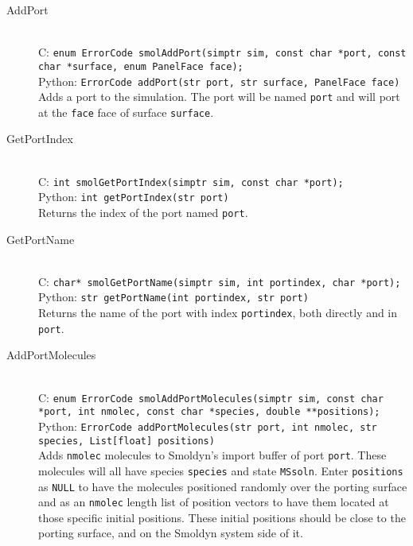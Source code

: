 \documentclass {book}
\begin{document}
\begin{description}

\item[AddPort]
\hfill \\
C: \texttt{enum ErrorCode smolAddPort(simptr sim, const char *port, const char *surface, enum PanelFace face);}\\
Python: \texttt{ErrorCode addPort(str port, str surface, PanelFace face)}\\
Adds a port to the simulation. The port will be named \texttt{port} and will port at the \texttt{face} face of surface \texttt{surface}.

\item[GetPortIndex]
\hfill \\
C: \texttt{int smolGetPortIndex(simptr sim, const char *port);}\\
Python: \texttt{int getPortIndex(str port)}\\
Returns the index of the port named \texttt{port}.

\item[GetPortName]
\hfill \\
C: \texttt{char* smolGetPortName(simptr sim, int portindex, char *port);}\\
Python: \texttt{str getPortName(int portindex, str port)}\\
Returns the name of the port with index \texttt{portindex}, both directly and in \texttt{port}.

\item[AddPortMolecules]
\hfill \\
C: \texttt{enum ErrorCode smolAddPortMolecules(simptr sim, const char *port, int nmolec, const char *species, double **positions);}\\
Python: \texttt{ErrorCode addPortMolecules(str port, int nmolec, str species, List[float] positions)}\\
Adds \texttt{nmolec} molecules to Smoldyn's import buffer of port \texttt{port}. These molecules will all have species \texttt{species} and state \texttt{MSsoln}. Enter \texttt{positions} as \texttt{NULL} to have the molecules positioned randomly over the porting surface and as an \texttt{nmolec} length list of position vectors to have them located at those specific initial positions. These initial positions should be close to the porting surface, and on the Smoldyn system side of it.


\end{description}
\end{document}
